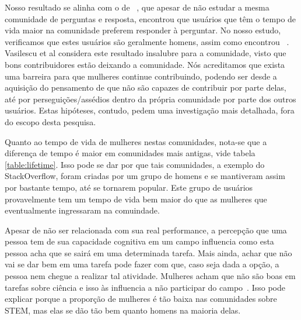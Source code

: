 Nosso resultado se alinha com o de ~\cite{yang2010activity}, que apesar de não estudar a mesma comunidade de perguntas e resposta, encontrou que usuários que têm o tempo de vida maior na comunidade preferem responder à perguntar. No nosso estudo, verificamos que estes usuários são geralmente homens, assim como encontrou ~\cite{Vasilescu27092013}. Vasilescu et al considera este resultado insalubre para a comunidade, visto que bons contribuidores estão deixando a comunidade. Nós acreditamos que exista uma barreira para que mulheres continue contribuindo, podendo ser desde a aquisição do pensamento de que não são capazes de contribuir por parte delas, até por perseguições/assédios dentro da própria comunidade por parte dos outros usuários. Estas hipóteses, contudo, pedem uma investigação mais detalhada, fora do escopo desta pesquisa.

Quanto ao tempo de vida de mulheres nestas comunidades, nota-se que a diferença de tempo é maior em comunidades mais antigas, vide tabela \ref{table:lifetime}. Isso pode se dar por que tais comunidades, a exemplo do StackOverflow, foram criadas por um grupo de homens e se mantiveram assim por bastante tempo, até se tornarem popular. Este grupo de usuários provavelmente tem um tempo de vida bem maior do que as mulheres que eventualmente ingressaram na comuindade. 


Apesar de não ser relacionada com sua real performance, a percepção que uma pessoa tem de sua capacidade cognitiva em um campo influencia como esta pessoa acha que se sairá em uma determinada tarefa. Mais ainda, achar que não vai se dar bem em uma tarefa pode fazer com que, caso seja dada a opção, a pessoa nem chegue a realizar tal atividade. Mulheres acham que não são boas em tarefas sobre ciência e isso às influencia a não participar do campo~\cite{ehrlinger2003chronic}. Isso pode explicar porque a proporção de mulheres é tão baixa nas comunidades sobre STEM, mas elas se dão tão bem quanto homens na maioria delas.



